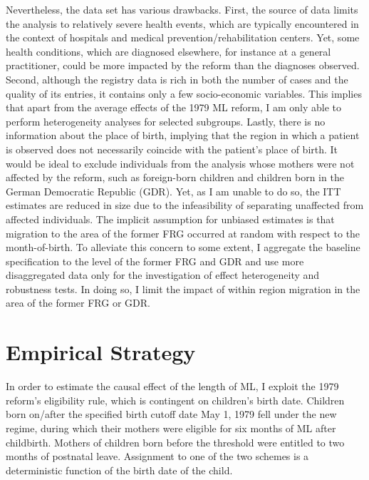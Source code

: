 Nevertheless, the data set has various drawbacks. First, the source of data limits the analysis to relatively severe health events, which are typically encountered in the context of hospitals and medical prevention/rehabilitation centers. Yet, some health conditions, which are diagnosed elsewhere, for instance at a general practitioner, could be more impacted by the reform than the diagnoses observed. %
Second, although the registry data is rich in both the number of cases and the quality of its entries, it contains only a few socio-economic variables. This implies that apart from the average effects of the 1979 ML reform, I am only able to perform heterogeneity analyses for selected subgroups. Lastly, there is no information about the place of birth, implying that the region in which a patient is observed does not necessarily coincide with the patient's place of birth. It would be ideal to exclude individuals from the analysis whose mothers were not affected by the reform, such as foreign-born children and children born in the German Democratic Republic (GDR). Yet, as I am unable to do so, the ITT estimates are reduced in size due to the infeasibility of separating unaffected from affected individuals. The implicit assumption for unbiased estimates is that migration to the area of the former FRG occurred at random with respect to the month-of-birth. To alleviate this concern to some extent, I aggregate the baseline specification to the level of the former FRG and GDR and use more disaggregated data only for the investigation of effect heterogeneity and robustness tests. In doing so, I limit the impact of within region migration in the area of the former FRG or GDR.


















\bigskip
\section{Empirical Strategy}\label{sec_mlch:empirical_strategy}
In order to estimate the causal effect of the length of ML, I exploit the 1979 reform's eligibility rule, which is contingent on children's birth date. Children born on/after the specified birth cutoff date May 1, 1979 fell under the new regime, during which their mothers were eligible for six months of ML after childbirth. Mothers of children born before the threshold were entitled to two months of postnatal leave. Assignment to one of the two schemes is a deterministic function of the birth date of the child.


